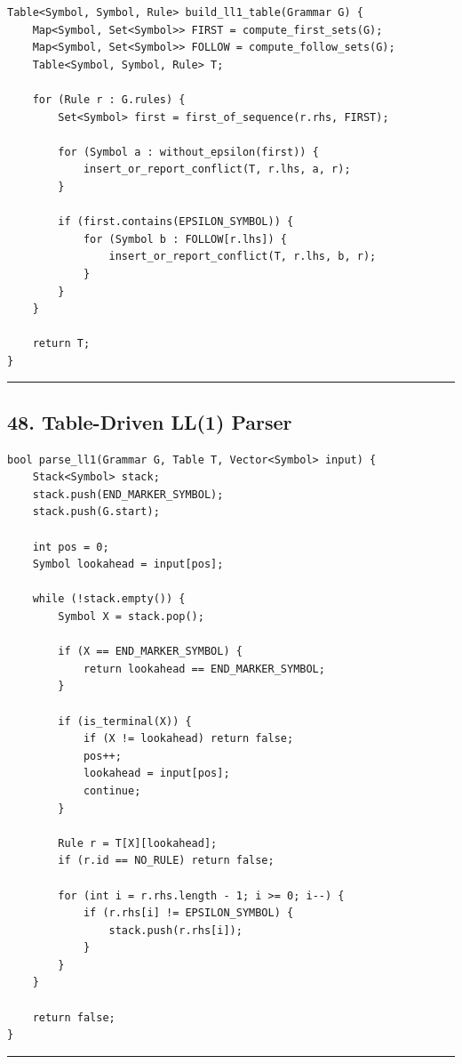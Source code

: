 \documentclass[10pt,letterpaper]{article}
\begin{document}
\begin{verbatim}
Table<Symbol, Symbol, Rule> build_ll1_table(Grammar G) {
    Map<Symbol, Set<Symbol>> FIRST = compute_first_sets(G);
    Map<Symbol, Set<Symbol>> FOLLOW = compute_follow_sets(G);
    Table<Symbol, Symbol, Rule> T;

    for (Rule r : G.rules) {
        Set<Symbol> first = first_of_sequence(r.rhs, FIRST);

        for (Symbol a : without_epsilon(first)) {
            insert_or_report_conflict(T, r.lhs, a, r);
        }

        if (first.contains(EPSILON_SYMBOL)) {
            for (Symbol b : FOLLOW[r.lhs]) {
                insert_or_report_conflict(T, r.lhs, b, r);
            }
        }
    }

    return T;
}
\end{verbatim}

\medskip\hrule\medskip

\subsection*{48. Table-Driven LL(1) Parser}

\begin{verbatim}
bool parse_ll1(Grammar G, Table T, Vector<Symbol> input) {
    Stack<Symbol> stack;
    stack.push(END_MARKER_SYMBOL);
    stack.push(G.start);

    int pos = 0;
    Symbol lookahead = input[pos];

    while (!stack.empty()) {
        Symbol X = stack.pop();

        if (X == END_MARKER_SYMBOL) {
            return lookahead == END_MARKER_SYMBOL;
        }

        if (is_terminal(X)) {
            if (X != lookahead) return false;
            pos++;
            lookahead = input[pos];
            continue;
        }

        Rule r = T[X][lookahead];
        if (r.id == NO_RULE) return false;

        for (int i = r.rhs.length - 1; i >= 0; i--) {
            if (r.rhs[i] != EPSILON_SYMBOL) {
                stack.push(r.rhs[i]);
            }
        }
    }

    return false;
}
\end{verbatim}

\medskip\hrule\medskip
\end{document}
